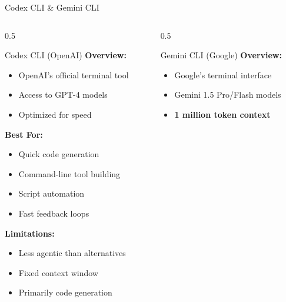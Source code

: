 \documentclass[aspectratio=169,11pt]{beamer}
\begin{document}
\begin{frame}{Codex CLI \& Gemini CLI}
    \begin{columns}[T]
        \begin{column}{0.5\textwidth}
            \begin{block}{Codex CLI (OpenAI)}
                \textbf{Overview:}
                \begin{itemize}
                    \item OpenAI's official terminal tool
                    \item Access to GPT-4 models
                    \item Optimized for speed
                \end{itemize}

                \textbf{Best For:}
                \begin{itemize}
                    \item Quick code generation
                    \item Command-line tool building
                    \item Script automation
                    \item Fast feedback loops
                \end{itemize}

                \textbf{Limitations:}
                \begin{itemize}
                    \item Less agentic than alternatives
                    \item Fixed context window
                    \item Primarily code generation
                \end{itemize}
            \end{block}
        \end{column}
        \begin{column}{0.5\textwidth}
            \begin{block}{Gemini CLI (Google)}
                \textbf{Overview:}
                \begin{itemize}
                    \item Google's terminal interface
                    \item Gemini 1.5 Pro/Flash models
                    \item \textcolor{Garnet}{\textbf{1 million token context}}
                \end{itemize}


\end{block}
\end{column}
\end{columns}
\end{frame}
\end{document}
